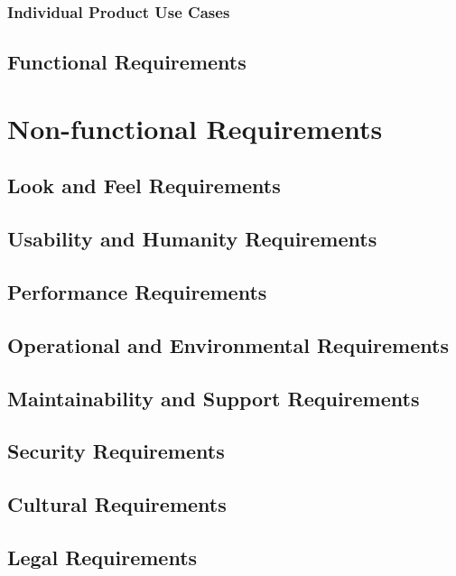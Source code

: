\documentclass[12pt, titlepage]{article}
\begin{document}
\subsubsection{Individual Product Use Cases}

\subsection{Functional Requirements}

\section{Non-functional Requirements}

\subsection{Look and Feel Requirements}

\subsection{Usability and Humanity Requirements}

\subsection{Performance Requirements}

\subsection{Operational and Environmental Requirements}

\subsection{Maintainability and Support Requirements}

\subsection{Security Requirements}

\subsection{Cultural Requirements}

\subsection{Legal Requirements}
\end{document}
